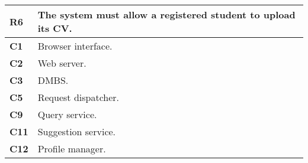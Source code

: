 \begin{table}[H]
    \centering
    \begin{tabular}{|l|m{10cm}|}
        \hline \textbf{R6} & The system must allow a registered student to upload its CV.\\
        \hline \textbf{C1} & Browser interface. \\
        \hline \textbf{C2} & Web server. \\
        \hline \textbf{C3} & DMBS. \\
        \hline \textbf{C5} & Request dispatcher. \\
        \hline \textbf{C9} & Query service. \\
        \hline \textbf{C11} & Suggestion service. \\
        \hline \textbf{C12} & Profile manager.\\
        \hline
    \end{tabular}
\end{table}


